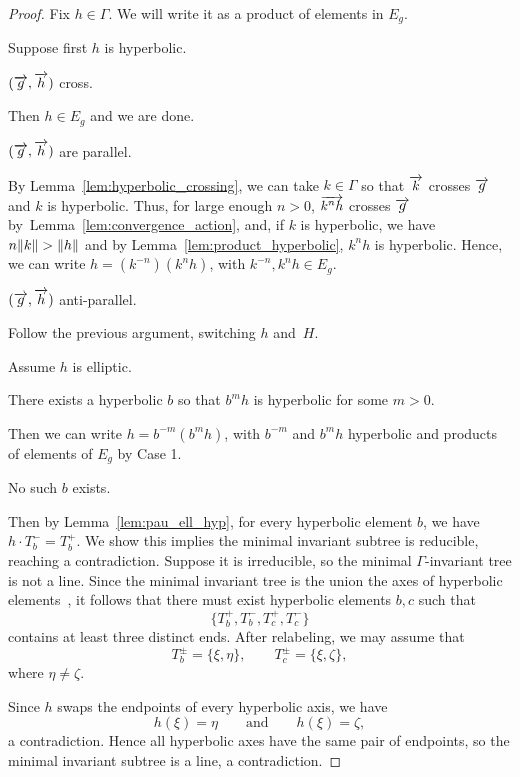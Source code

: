 \begin{proof}
  Fix $h \in \Gamma$. We will write it as a product of elements in $E_g$.
    \begin{case}
\label{case:generate_hyperbolic}
    Suppose first $h$ is hyperbolic.
  \end{case}
    \begin{subcase}
    \label{subcase:generate_hyp_cross}
    $(\overrightarrow{g},\overrightarrow{h})$  cross.
    \end{subcase} Then $h \in E_g$ and we are done.
    \begin{subcase}
    \label{subcase:generate_hyp_parallel}
    $(\overrightarrow{g},\overrightarrow{h})$ are parallel.
    \end{subcase}
    By Lemma~\ref{lem:hyperbolic_crossing}, we can take $k \in \Gamma$ so that $\overrightarrow{k}$ crosses $\overrightarrow{g}$ and $k$ is hyperbolic.
    Thus, for large enough $n>0$, $\overrightarrow{k^nh}$ crosses $\overrightarrow{g}$ by~Lemma~\ref{lem:convergence_action}, and, if $k$ is hyperbolic, we have $n\lVert k\rVert>\lVert h\rVert$ and by Lemma~\ref{lem:product_hyperbolic}, $k^nh$ is hyperbolic.
    Hence, we can write $h=(k^{-n})(k^n h)$, with $k^{-n}, k^nh \in E_g$.
    \begin{subcase}
      $(\overrightarrow{g},\overrightarrow{h})$ anti-parallel.
\end{subcase}
      Follow the previous argument, switching $h$ and~$H$.
\begin{case}
\label{case:generate_ell}
    Assume $h$ is elliptic.
    \end{case}
    \begin{subcase}
    \label{subcase:generate_ell_coherent}
    There exists a hyperbolic $b$ so that $b^m h$ is hyperbolic for some $m>0$.
       \end{subcase} 
    Then we can write $h=b^{-m}(b^mh)$, with $b^{-m}$ and $b^mh$ hyperbolic and products of elements of $E_g$ by Case 1.
       \begin{subcase}
       \label{subcase:generate_ell_incoherent}
       No such $b$ exists.
    \end{subcase}
       Then by Lemma~\ref{lem:pau_ell_hyp}, for every hyperbolic element $b$, we have $h \cdot T_b^-=T_b^+$.
    We show this implies the minimal invariant subtree is reducible, reaching a contradiction.
Suppose it is irreducible, so the minimal $\Gamma$-invariant tree is not a line. Since the minimal invariant tree is the union the axes of hyperbolic elements~\cite[the proof of Proposition~3.1]{CM87:GroupActions}, it follows that there must exist hyperbolic elements $b,c$ such that
\[
\{T_b^+,T_b^-,T_c^+,T_c^-\}
\]
contains at least three distinct ends. After relabeling, we may assume that
\[
T_b^\pm=\{\xi,\eta\},
\qquad
T_c^\pm=\{\xi,\zeta\},
\]
where $\eta\neq\zeta$.

Since $h$ swaps the endpoints of every hyperbolic axis, we have
\[
h(\xi)=\eta
\qquad\text{and}\qquad
h(\xi)=\zeta,
\]
a contradiction. Hence all hyperbolic axes have the same pair of endpoints, so the minimal invariant subtree is a line, a contradiction.
\end{proof}

